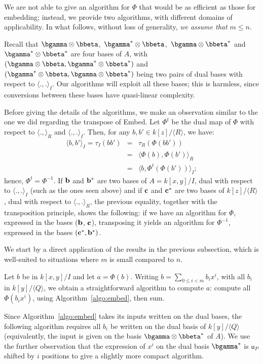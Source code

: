 \documentclass{sig-alternate}
\def\vu {\ensuremath{\mathsf{u}}}
\newcounter{algo}
\newcommand{\ang}[1]{\langle#1\rangle}
\begin{document}
We are not able to give an algorithm for $\Phi$ that would be as
efficient as those for embedding; instead, we provide two algorithms,
with different domains of applicability. In what follows, without
loss of generality, {\em we assume that $m\le n$}.

Recall that $\bgamma \otimes \bbeta$,\ $\bgamma^\ast \otimes
\bbeta$,\ $\bgamma \otimes \bbeta^\ast$ and $\bgamma^\ast \otimes
\bbeta^\ast$ are four bases of $A$, with $(\bgamma \otimes \bbeta,
\bgamma^\ast \otimes \bbeta^\ast)$ and $(\bgamma^\ast \otimes \bbeta,
\bgamma \otimes \bbeta^\ast)$ being two pairs of dual bases with
respect to $\ang{.,.}_I$. Our algorithms will exploit all these bases;
this is harmless, since conversions between these bases have
quasi-linear complexity.

Before giving the details of the algorithms, we make an observation
similar to the one we did regarding the transpose of Embed. Let
$\Phi^t$ be the dual map of $\Phi$ with respect to $\ang{.,}_R$ and
$\ang{.,.}_I$. Then, for any $b,b' \in k[z]/\ang{R}$, we have:
\begin{eqnarray*}
\ang{b,b'}_I=\tau_I(b b') &=&  \tau_R(\Phi(b b'))\\
&=& \ang{\Phi(b), \Phi(b')}_R \\
&=& \ang{b, \Phi^t(\Phi(b'))}_I;
\end{eqnarray*}
hence, $\Phi^t = \Phi^{-1}$. If ${\bf b}$ and ${\bf b}^\ast$ are two
bases of $A=k[x,y]/I$, dual with respect to $\ang{.,.}_I$ (such as the
ones seen above) and if ${\bf c}$ and ${\bf c}^\ast$ are two bases of
$k[z]/\ang{R}$, dual with respect to $\ang{.,.}_R$, the previous
equality, together with the transposition principle, shows the
following: if we have an algorithm for $\Phi$, expressed in the bases
(${\bf b}$, ${\bf c}$), transposing it yields an algorithm for
$\Phi^{-1}$, expressed in the bases $({\bf c}^\ast,{\bf b}^\ast)$.

\smallskip{}
We start by a direct application of the results in the previous
subsection, which is well-suited to situations where $m$ is small
compared to $n$.

Let $b$ be in $k[x,y]/I$ and let $a=\Phi(b)$. Writing $b=\sum_{0 \le i
  < m} b_i x^i$, with all $b_i$ in $k[y]/\ang{Q}$, we obtain a
straightforward algorithm to compute $a$: compute all $\Phi(b_i x^i)$,
using Algorithm~\ref{algo:embed}, then sum.

Since Algorithm~\ref{algo:embed} takes its inputs written on the dual
bases, the following algorithm requires all $b_i$ be written on the
dual basis of $k[y]/\ang{Q}$ (equivalently, the input is given on the
basis $\bgamma \otimes \bbeta^\ast$ of $A$). We use the further
observation that the expression of $x^i$ on the dual basis
$\bgamma^\ast$ is $\vu_P$ shifted by $i$ positions to give a slightly
more compact algorithm.
\end{document}
